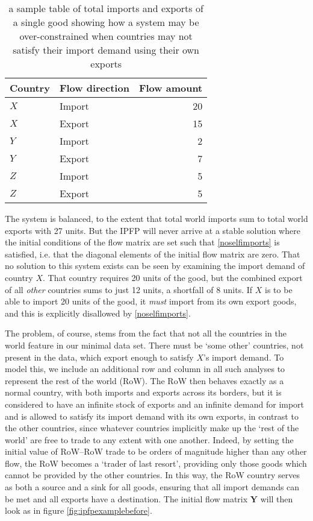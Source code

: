 \documentclass[preprint,authoryear,3p]{elsarticle}
\begin{document}
\begin{table}
\centering
\begin{tabular}{llr}
\toprule
Country & Flow direction & Flow amount \\ 
\midrule
$X$ & Import & 20 \\
$X$ & Export & 15 \\ \addlinespace
$Y$ & Import & 2 \\
$Y$ & Export & 7 \\ \addlinespace
$Z$ & Import & 5 \\
$Z$ & Export & 5 \\
\bottomrule
\end{tabular}
\caption{a sample table of total imports and exports of a single good showing how a system may be over-constrained when countries may not satisfy their import demand using their own exports}
\label{tab:xyzflows}
\end{table}

The system is balanced, to the extent that total world imports sum to total world exports with 27 units. But the IPFP will never arrive at a stable solution where the initial conditions of the flow matrix are set such that \eqref{noselfimports} is satisfied, i.e. that the diagonal elements of the initial flow matrix are zero. That no solution to this system exists can be seen by examining the import demand of country $X$. That country requires 20 units of the good, but the combined export of all \textit{other} countries sums to just 12 units, a shortfall of 8 units. If $X$ is to be able to import 20 units of the good, it \textit{must} import from its own export goods, and this is explicitly disallowed by \eqref{noselfimports}.

The problem, of course, stems from the fact that not all the countries in the world feature in our minimal data set. There must be `some other' countries, not present in the data, which export enough to satisfy $X$'s import demand. To model this, we include an additional row and column in all such analyses to represent the rest of the world (RoW). The RoW then behaves exactly as a normal country, with both imports and exports across its borders, but it is considered to have an infinite stock of exports and an infinite demand for import and is allowed to satisfy its import demand with its own exports, in contrast to the other countries, since whatever countries implicitly make up the `rest of the world' are free to trade to any extent with one another. Indeed, by setting the initial value of RoW--RoW trade to be orders of magnitude higher than any other flow, the RoW becomes a `trader of last resort', providing only those goods which cannot be provided by the other countries. In this way, the RoW country serves as both a source and a sink for all goods, ensuring that all import demands can be met and all exports have a destination. The initial flow matrix $\textbf{Y}$ will then look as in figure \ref{fig:ipfpexamplebefore}.
\end{document}
